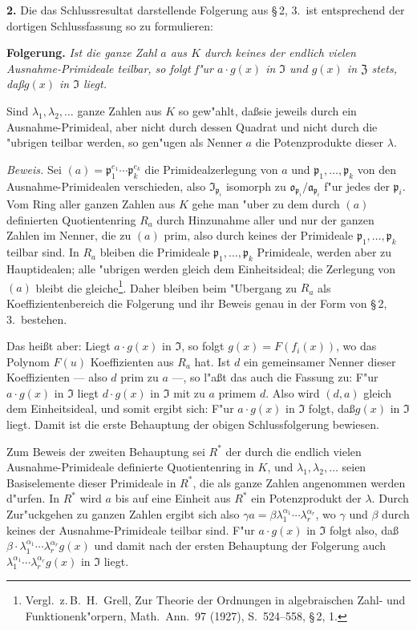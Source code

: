 \medskip\noindent\textbf{2.}
Die das Schlussresultat darstellende Folgerung aus \S\,2, 3.\ ist entsprechend der dortigen Schlussfassung so zu formulieren:

\noindent\textbf{Folgerung.}
\textit{Ist die ganze Zahl $a$ aus $K$ durch keines der endlich vielen Ausnahme-Primideale teilbar, so folgt f"ur $a \cdot g(x)$ in $\mathfrak{I}$ und $g(x)$ in $\mathfrak{Z}$ stets, da\ss $g(x)$ in $\mathfrak{I}$ liegt.}

Sind $\lambda_1,\lambda_2,\ldots$ ganze Zahlen aus $K$ so gew"ahlt, da\ss sie jeweils durch ein Ausnahme-Primideal, aber nicht durch dessen Quadrat und nicht durch die "ubrigen teilbar werden, so gen"ugen als Nenner $a$ die Potenzprodukte dieser $\lambda$.

\noindent\textit{Beweis.}
Sei $(a) = \mathfrak{p}_1^{e_1} \cdots \mathfrak{p}_k^{e_k}$ die Primidealzerlegung von $a$ und $\mathfrak{p}_1,\ldots,\mathfrak{p}_k$ von den Ausnahme-Primidealen verschieden, also $\mathfrak{I}_{\mathfrak{p}_i}$ isomorph zu $\mathfrak{o}_{\mathfrak{p}_i}/\mathfrak{a}_{\mathfrak{p}_i}$ f"ur jedes der $\mathfrak{p}_i$. Vom Ring aller ganzen Zahlen aus $K$ gehe man "uber zu dem durch $(a)$ definierten Quotientenring $R_a$ durch Hinzunahme aller und nur der ganzen Zahlen im Nenner, die zu $(a)$ prim, also durch keines der Primideale $\mathfrak{p}_1,\ldots,\mathfrak{p}_k$ teilbar sind. In $R_a$ bleiben die Primideale $\mathfrak{p}_1,\ldots,\mathfrak{p}_k$ Primideale, werden aber zu Hauptidealen; alle "ubrigen werden gleich dem Einheitsideal; die Zerlegung von $(a)$ bleibt die gleiche\footnote{Vergl.\ z.\,B.\ H.\ Grell, Zur Theorie der Ordnungen in algebraischen Zahl- und Funktionenk"orpern, Math.\ Ann.\ 97 (1927), S.\ 524--558, \S\,2, 1.}. Daher bleiben beim "Ubergang zu $R_a$ als Koeffizientenbereich die Folgerung und ihr Beweis genau in der Form von \S\,2, 3.\ bestehen.

Das hei\ss t aber: Liegt $a \cdot g(x)$ in $\mathfrak{I}$, so folgt $g(x) = F(f_i(x))$, wo das Polynom $F(u)$ Koeffizienten aus $R_a$ hat. Ist $d$ ein gemeinsamer Nenner dieser Koeffizienten --- also $d$ prim zu $a$ ---, so l"a\ss t das auch die Fassung zu: F"ur $a \cdot g(x)$ in $\mathfrak{I}$ liegt $d \cdot g(x)$ in $\mathfrak{I}$ mit zu $a$ primem $d$. Also wird $(d, a)$ gleich dem Einheitsideal, und somit ergibt sich: F"ur $a \cdot g(x)$ in $\mathfrak{I}$ folgt, da\ss $g(x)$ in $\mathfrak{I}$ liegt. Damit ist die erste Behauptung der obigen Schlussfolgerung bewiesen.

Zum Beweis der zweiten Behauptung sei $R^*$ der durch die endlich vielen Ausnahme-Primideale definierte Quotientenring in $K$, und $\lambda_1,\lambda_2,\ldots$ seien Basiselemente dieser Primideale in $R^*$, die als ganze Zahlen angenommen werden d"urfen. In $R^*$ wird $a$ bis auf eine Einheit aus $R^*$ ein Potenzprodukt der $\lambda$. Durch Zur"uckgehen zu ganzen Zahlen ergibt sich also $\gamma a = \beta \lambda_1^{\alpha_1} \cdots \lambda_r^{\alpha_r}$, wo $\gamma$ und $\beta$ durch keines der Ausnahme-Primideale teilbar sind. F"ur $a \cdot g(x)$ in $\mathfrak{I}$ folgt also, da\ss $\beta \cdot \lambda_1^{\alpha_1} \cdots \lambda_r^{\alpha_r} g(x)$ und damit nach der ersten Behauptung der Folgerung auch $\lambda_1^{\alpha_1} \cdots \lambda_r^{\alpha_r} g(x)$ in $\mathfrak{I}$ liegt.

